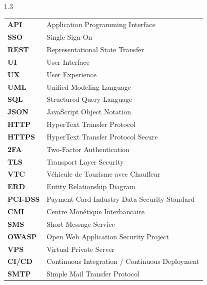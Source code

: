 \documentclass[a4paper,12pt]{report}
\begin{document}
\begin{spacing}{1.3}

\begin{tabular}{p{3cm} p{11cm}}

\textbf{API} & Application Programming Interface \\

\textbf{SSO} & Single Sign-On \\

\textbf{REST} & Representational State Transfer \\

\textbf{UI} & User Interface \\

\textbf{UX} & User Experience \\

\textbf{UML} & Unified Modeling Language \\

\textbf{SQL} & Structured Query Language \\

\textbf{JSON} & JavaScript Object Notation \\


\textbf{HTTP} & HyperText Transfer Protocol \\

\textbf{HTTPS} & HyperText Transfer Protocol Secure \\

\textbf{2FA} & Two-Factor Authentication \\

\textbf{TLS} & Transport Layer Security \\

\textbf{VTC} & Véhicule de Tourisme avec Chauffeur \\

\textbf{ERD} & Entity Relationship Diagram \\

\textbf{PCI-DSS} & Payment Card Industry Data Security Standard \\

\textbf{CMI} & Centre Monétique Interbancaire \\

\textbf{SMS} & Short Message Service \\

\textbf{OWASP} & Open Web Application Security Project \\

\textbf{VPS} & Virtual Private Server \\

\textbf{CI/CD} & Continuous Integration / Continuous Deployment \\

\textbf{SMTP} & Simple Mail Transfer Protocol \\


\end{tabular}

\end{spacing}
\end{document}
